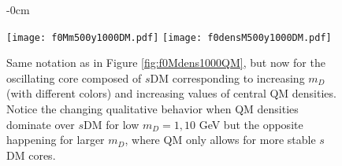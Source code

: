 \documentclass[universe,article,accept,moreauthors,pdftex]{Definitions/mdpi}
\begin{document}
\begin{figure}[H]\ContinuedFloat


\begin{adjustwidth}{-\extralength}{0cm}
\centering %

{\texttt{[image: f0Mm500y1000DM.pdf]}\vspace{3pt}
	  \texttt{[image: f0densM500y1000DM.pdf]}}
\end{adjustwidth}
\caption{Same notation as in Figure \ref{fig:f0Mdens1000QM}, but now for the oscillating core composed of $s$DM corresponding to increasing $m_{D}$ (with different colors) and increasing values of central QM densities. Notice the changing qualitative behavior when QM densities dominate over $s$DM for low $m_{D}=1,10$ GeV but the opposite happening for larger $m_{D}$, where QM only allows for more stable $s$DM cores.}
\label{fig:f0Mdens1000DM}%

\end{figure}
\end{document}
